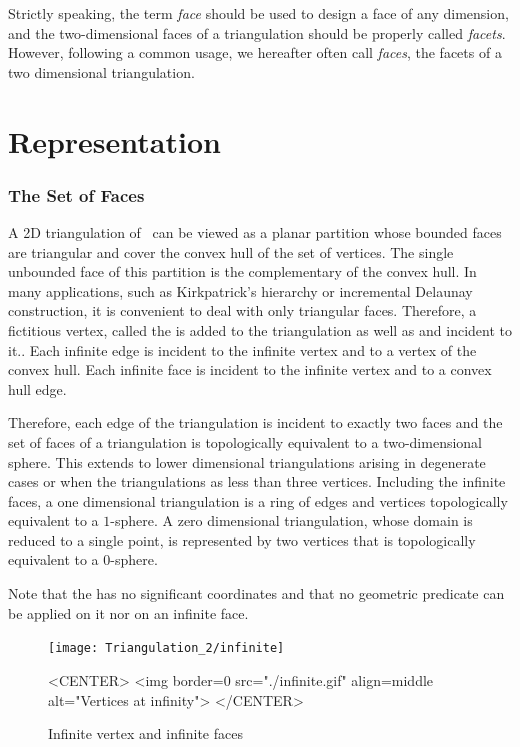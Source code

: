 Strictly speaking, the term {\em face} should be used
to design  a face of any dimension,
and the two-dimensional faces of a triangulation 
should be properly called {\em facets}.
However, following a common usage, we hereafter often call {\em
faces}, the facets
of a two dimensional triangulation.

\section{Representation\label{Section_2D_Triangulations_Representation}}

\subsubsection{The Set of Faces}

A 2D triangulation  of \cgal\ can be viewed as a planar partition 
whose bounded faces are triangular and cover
the convex hull of the set of vertices. 
The single unbounded face of this partition
is the complementary of the convex hull. 
In many applications, such as Kirkpatrick's hierarchy
or incremental Delaunay construction, it is convenient to
deal with only triangular faces. Therefore, 
a fictitious vertex, called the 
is added to the triangulation as well as
 and  incident to it..
Each infinite edge
is incident to the infinite vertex and to a vertex of the convex hull.
Each infinite face is incident to the infinite vertex
and to a convex hull edge. 

Therefore, each edge of the triangulation
is incident to exactly two faces
and the set of faces of a triangulation is topologically
equivalent to a two-dimensional sphere.
This extends to  lower dimensional triangulations
arising in degenerate cases or when the triangulations
as less than three vertices.
Including the infinite faces, 
a one dimensional triangulation
is a ring of edges and vertices
topologically equivalent to a $1$-sphere.
A zero dimensional triangulation, whose domain is reduced to a
single point, is represented by  two vertices that is
topologically equivalent to a $0$-sphere.

Note that
the  has no significant
coordinates and that no geometric predicate can be applied on it
nor on an infinite face.

\begin{figure}
\begin{ccTexOnly}
\begin{center}
\texttt{[image: Triangulation\_2/infinite]} 
\end{center}
\end{ccTexOnly}

\begin{ccHtmlOnly}
<CENTER>
<img border=0 src="./infinite.gif" align=middle alt="Vertices at
infinity">
</CENTER>
\end{ccHtmlOnly}

\caption{Infinite vertex and infinite faces
\label{2D_Triangulation_Fig_infinite_vertex}}

\end{figure}




